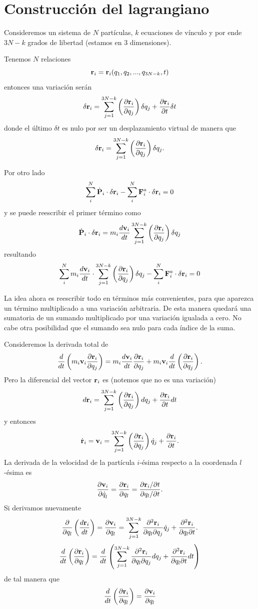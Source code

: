 \documentclass[10pt,oneside]{CBFT_article}
\begin{document}
\section{Construcción del lagrangiano}

Consideremos un sistema de $N$ partículas, $k$ ecuaciones de vínculo y por ende $3N - k$ grados de libertad
(estamos en 3 dimensiones).

Tenemos $N$ relaciones
\[
\vb{r}_i = \vb{r}_i(q_1,q_2,...,q_{3N-k},t)
\]
entonces una variación serán
\[
\delta \vb{r}_i =  \sum_{j=1}^{3N-k} \left( \dpar{\vb{r}_i}{q_j} \right) \delta q_j + \dpar{\vb{r}_i}{t}\delta t
\]
donde el último $\delta t$ es nulo por ser un desplazamiento virtual de manera que
\[
\delta \vb{r}_i =  \sum_{j=1}^{3N-k} \left( \dpar{\vb{r}_i}{q_j} \right) \delta q_j.
\]

Por otro lado
\[
\sum_i^N \dot{\vb{P}}_i \cdot \delta \vb{r}_i - \sum_i^N  \vb{F}_i^a \cdot \delta \vb{r}_i = 0
\]
y se puede reescribir el primer término como
\[
\dot{\vb{P}}_i \cdot \delta \vb{r}_i = m_i \dtot{\vb{v}_i}{t}\sum_{j=1}^{3N-k} \left( \dpar{\vb{r}_i}{q_j} \right) \delta q_j
\]
resultando
\[
\sum_i^N m_i \dtot{\vb{v}_i}{t} \cdot \sum_{j=1}^{3N-k} \left( \dpar{\vb{r}_i}{q_j} \right) \delta q_j
- \sum_i^N  \vb{F}_i^a \cdot \delta \vb{r}_i = 0
\]

La idea ahora es reescribir todo en términos más convenientes, para que aparezca un término multiplicado
a una variación arbitraria. De esta manera quedará una sumatoria de un sumando multiplicado por una
variación igualada a cero. No cabe otra posibilidad que el sumando sea nulo para cada índice de la suma.

Consideremos la derivada total de 
\[
\frac{d}{dt}\left( m_i\vb{v}_i\dpar{\vb{r}_i}{q_j} \right) =
m_i \dtot{\vb{v}_i}{t}\dpar{\vb{r}_i}{q_j} + m_i \vb{v}_i \frac{d}{dt}\left(\dpar{\vb{r}_i}{q_j}\right).
\]
Pero la diferencial del vector $\vb{r}_i$ es (notemos que no es una variación)
\[
d\vb{r}_i = \sum_{j=1}^{3N-k} \left( \dpar{\vb{r}_i}{q_j} \right) dq_j + \dpar{\vb{r}_i}{t} dt
\]
y entonces
\[
\dot{\vb{r}}_i = \vb{v}_i = \sum_{j=1}^{3N-k} \left( \dpar{\vb{r}_i}{q_j} \right) \dot{q}_j + \dpar{\vb{r}_i}{t}.
\]
La derivada de la velocidad de la partícula $i$-ésima respecto a la coordenada $l$-ésima es
\[
\dpar{\vb{v}_i}{\dot{q}_l} = \dpar{\vb{r}_i}{q_l} = \frac{\partial \vb{r}_i/\partial t}{\partial q_l/\partial t}.
\]
Si derivamos nuevamente
\[
\frac{\partial}{\partial q_l} \left( \dtot{\vb{r}_i}{t} \right) =
\dpar{\vb{v}_i}{q_l} = \sum_{j=1}^{3N-k} \dparcru{\vb{r}_i}{q_j}{q_l} \dot{q}_j + \dparcru{\vb{r}_i}{t}{q_l}.
\]
\[
\frac{d}{dt} \left( \dpar{\vb{r}_i}{q_l} \right) = 
\frac{d}{dt} \left( \sum_{j=1}^{3N-k} \dparcru{\vb{r}_i}{q_j}{q_l} dq_j + \dparcru{\vb{r}_i}{t}{q_l} dt \right) 
\]
de tal manera que 
\[
\frac{d}{dt} \left( \dpar{\vb{r}_i}{q_l} \right) = \dpar{\vb{v}_i}{q_l}
\]
\end{document}
